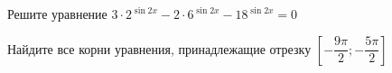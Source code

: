 \begin{ex}
	\begin{condition}
		\begin{enumcols}[label=\asbuk*)]
			\item Решите уравнение \( 3\cdot2^{\sin 2x} - 2\cdot6^{\sin 2x} - 18^{\sin 2x} =0 \)
			\item Найдите все корни уравнения, принадлежащие отрезку \( \left[-\dfrac{9\pi}{2};-\dfrac{5\pi}{2}\right] \)
		\end{enumcols}
	\end{condition}
\end{ex}